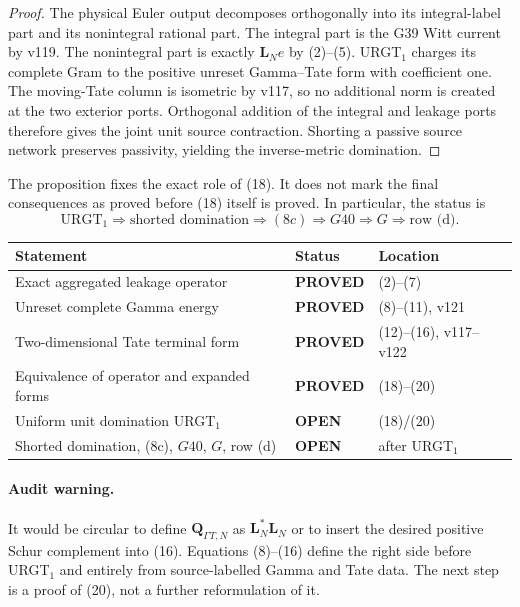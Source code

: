 \documentclass[11pt]{article}
\newcommand{\PROVED}{\textcolor{green!40!black}{\textbf{PROVED}}}
\newcommand{\OPEN}{\textcolor{red!70!black}{\textbf{OPEN}}}
\begin{document}
\begin{proof}
The physical Euler output decomposes orthogonally into its integral-label
part and its nonintegral rational part.  The integral part is the G39 Witt
current by v119.  The nonintegral part is exactly $\mathbf L_Ne$ by
(2)--(5).  URGT$_1$ charges its complete Gram to the positive unreset
Gamma--Tate form with coefficient one.  The moving-Tate column is
isometric by v117, so no additional norm is created at the two exterior
ports.  Orthogonal addition of the integral and leakage ports therefore
gives the joint unit source contraction.  Shorting a passive source
network preserves passivity, yielding the inverse-metric domination.
\end{proof}

The proposition fixes the exact role of (18).  It does not mark the final
consequences as proved before (18) itself is proved.  In particular, the
status is
\[
 \text{URGT$_1$}
 \Longrightarrow \text{shorted domination}
 \Longrightarrow (8c)
 \Longrightarrow G40
 \Longrightarrow G
 \Longrightarrow \text{row (d)}.
\]

\begin{center}
\begin{tabular}{>{\raggedright\arraybackslash}p{.57\linewidth}
                >{\centering\arraybackslash}p{.14\linewidth}
                >{\raggedright\arraybackslash}p{.19\linewidth}}
\toprule
Statement & Status & Location \\
\midrule
Exact aggregated leakage operator & \PROVED & (2)--(7) \\
Unreset complete Gamma energy & \PROVED & (8)--(11), v121 \\
Two-dimensional Tate terminal form & \PROVED & (12)--(16), v117--v122 \\
Equivalence of operator and expanded forms & \PROVED & (18)--(20) \\
Uniform unit domination URGT$_1$ & \OPEN & (18)/(20) \\
Shorted domination, (8c), $G40$, $G$, row (d) & \OPEN & after URGT$_1$ \\
\bottomrule
\end{tabular}
\end{center}

\paragraph{Audit warning.}
It would be circular to define $\mathbf Q_{\Gamma T,N}$ as
$\mathbf L_N^*\mathbf L_N$ or to insert the desired positive Schur
complement into (16).  Equations (8)--(16) define the right side before
URGT$_1$ and entirely from source-labelled Gamma and Tate data.  The next
step is a proof of (20), not a further reformulation of it.
\end{document}
